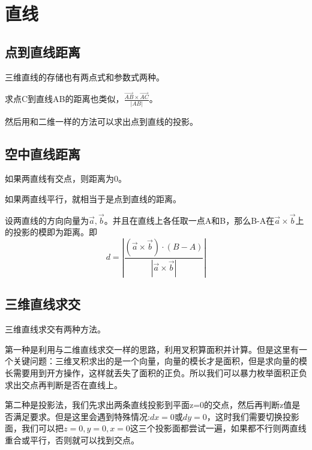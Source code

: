 \section{直线}

\subsection{点到直线距离}
\begin{frame}
\pause
三维直线的存储也有两点式和参数式两种。

\pause
求点C到直线AB的距离也类似，$\frac{ \overrightarrow{AB} \times \overrightarrow{AC} } { |AB| }$。

\pause
然后用和二维一样的方法可以求出点到直线的投影。
\end{frame}

\subsection{空中直线距离}
\begin{frame}
\pause
如果两直线有交点，则距离为0。

\pause
如果两直线平行，就相当于是点到直线的距离。

\pause
设两直线的方向向量为$\overrightarrow{a},\overrightarrow{b}$。并且在直线上各任取一点A和B，那么B-A在$\overrightarrow{a} \times \overrightarrow{b}$上的投影的模即为距离。即
\begin{displaymath}
    d=\left| \frac{ (\overrightarrow{a} \times \overrightarrow{b}) \cdot (B-A) }{ |\overrightarrow{a} \times \overrightarrow{b}| } \right|
\end{displaymath}
\end{frame}

\subsection{三维直线求交}
\begin{frame}
\pause
三维直线求交有两种方法。

\pause
第一种是利用与二维直线求交一样的思路，利用叉积算面积并计算。但是这里有一个关键问题：三维叉积求出的是一个向量，向量的模长才是面积，但是求向量的模长需要用到开方操作，这样就丢失了面积的正负。所以我们可以暴力枚举面积正负求出交点再判断是否在直线上。

\pause
第二种是投影法，我们先求出两条直线投影到平面z=0的交点，然后再判断z值是否满足要求。但是这里会遇到特殊情况:$dx=0$或$dy=0$，这时我们需要切换投影面，我们可以把$z=0,y=0,x=0$这三个投影面都尝试一遍，如果都不行则两直线重合或平行，否则就可以找到交点。
\end{frame}

